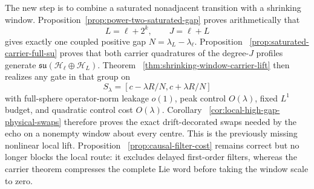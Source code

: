 \documentclass[11pt]{article}
\theoremstyle{remark}
\begin{document}
 The new step is to combine a saturated nonadjacent transition with a
 shrinking window.  Proposition~\ref{prop:power-two-saturated-gap} proves
 arithmetically that
 \[
  L=\ell+2^k,\qquad J=\ell+L
 \]
 gives exactly one coupled positive gap
 $N=\lambda_L-\lambda_\ell$.  Proposition
 ~\ref{prop:saturated-carrier-full-su} proves that both carrier quadratures of
 the degree-$J$ profiles generate
 $\mathfrak{su}(\mathcal H_\ell\oplus\mathcal H_L)$.  Theorem
 ~\ref{thm:shrinking-window-carrier-lift} then realizes any gate in that group
 on
 \[
  S_\lambda=[c-\lambda R/N,c+\lambda R/N]
 \]
 with full-sphere operator-norm leakage $o(1)$, peak control $O(\lambda)$,
 fixed $L^1$ budget, and quadratic control cost $O(\lambda)$.  Corollary
 ~\ref{cor:local-high-gap-physical-swaps} therefore proves the exact
 drift-decorated swaps needed by the echo on a nonempty window about every
 centre.  This is the previously missing nonlinear local lift.  Proposition
 ~\ref{prop:causal-filter-cost} remains correct but no longer blocks the local
 route: it excludes delayed first-order filters, whereas the carrier theorem
 compresses the complete Lie word before taking the window scale to zero.
\end{document}
